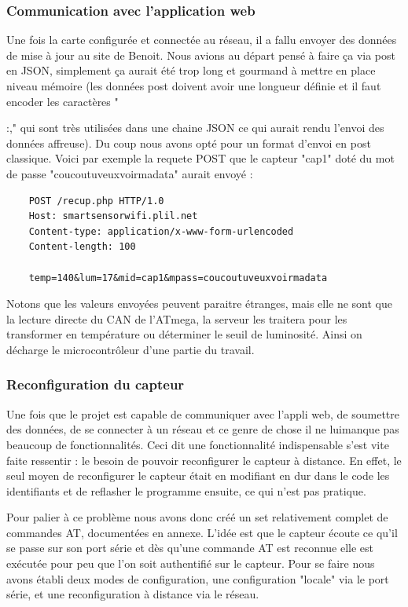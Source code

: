 		\subsubsection{Communication avec l'application web}
		Une fois la carte configurée et connectée au réseau, il a fallu envoyer des données de mise à jour au
		site de Benoit. Nous avions au départ pensé à faire ça via post en JSON, simplement ça aurait
		été trop long et gourmand à mettre en place niveau mémoire (les données post doivent avoir
		une longueur définie et il faut encoder les caractères "{:," qui sont très utilisées dans une
		chaine JSON ce qui aurait rendu l'envoi des données affreuse). Du coup nous avons opté pour un
		format d'envoi en post classique. Voici par exemple la requete POST que le capteur "cap1" doté du mot de passe
		"coucoutuveuxvoirmadata" aurait envoyé :
		
		\begin{verbatim}
    POST /recup.php HTTP/1.0
    Host: smartsensorwifi.plil.net
    Content-type: application/x-www-form-urlencoded
    Content-length: 100
    
    temp=140&lum=17&mid=cap1&mpass=coucoutuveuxvoirmadata
		\end{verbatim}
		
		\par Notons que les valeurs envoyées peuvent paraitre étranges, mais elle ne sont que la lecture
		directe du CAN de l'ATmega, la serveur les traitera pour les transformer en température ou
		déterminer le seuil de luminosité. Ainsi on décharge le microcontrôleur d'une partie
		du travail.
		
		\subsubsection{Reconfiguration du capteur}
		Une fois que le projet est capable de communiquer avec l'appli web, de soumettre
		des données, de se connecter à un réseau et ce genre de chose il ne luimanque pas beaucoup de fonctionnalités.
		Ceci dit une fonctionnalité indispensable s'est vite faite ressentir :
		le besoin de pouvoir reconfigurer le capteur à distance. En effet, le
		seul moyen de reconfigurer le capteur était en modifiant en dur dans le code les identifiants et
		de reflasher le programme ensuite, ce qui n'est pas pratique.

		Pour palier à ce problème nous avons donc créé un set relativement complet de commandes AT,
		documentées en annexe. L'idée est que le capteur écoute ce qu'il se passe sur son port série
		et dès qu'une commande AT est reconnue elle est exécutée pour peu que l'on soit authentifié sur
		le capteur. Pour se faire nous avons établi deux modes de configuration, une configuration "locale" via
		le port série, et une reconfiguration à distance via le réseau. 
		
}
